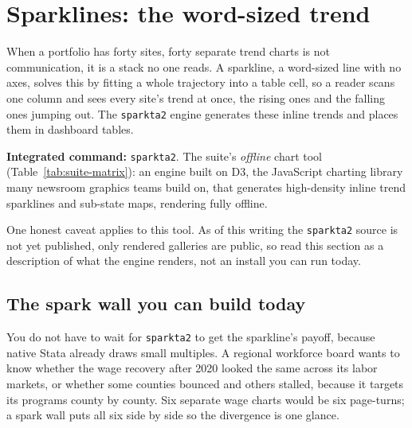 \section{Sparklines: the word-sized trend}
When a portfolio has forty sites, forty separate trend charts is not communication, it is a stack no one reads. A sparkline, a word-sized line with no axes, solves this by fitting a whole trajectory into a table cell, so a reader scans one column and sees every site's trend at once, the rising ones and the falling ones jumping out. The \texttt{sparkta2} engine generates these inline trends and places them in dashboard tables.

\begin{kaobox}[frametitle=Package Integration: \texttt{sparkta2}]
\textbf{Integrated command:} \texttt{sparkta2}. The suite's \emph{offline} chart tool (Table~\ref{tab:suite-matrix}): an engine built on D3, the JavaScript charting library many newsroom graphics teams build on, that generates high-density inline trend sparklines and sub-state maps, rendering fully offline.
\end{kaobox}

One honest caveat applies to this tool. As of this writing the \texttt{sparkta2} source is not yet published, only rendered galleries are public, so read this section as a description of what the engine renders, not an install you can run today.

\subsection{The spark wall you can build today}\label{sec:sparkwall}
You do not have to wait for \texttt{sparkta2} to get the sparkline's payoff, because native Stata already draws small multiples. A regional workforce board wants to know whether the wage recovery after 2020 looked the same across its labor markets, or whether some counties bounced and others stalled, because it targets its programs county by county. Six separate wage charts would be six page-turns; a spark wall puts all six side by side so the divergence is one glance.

